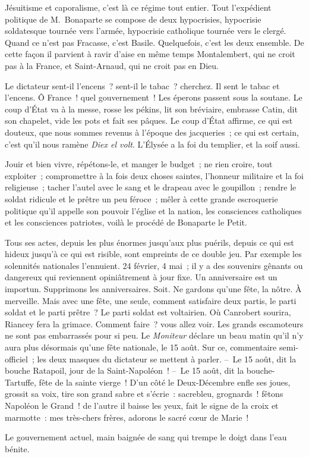 \documentclass[french,twoside]{book} %
\begin{document}
Jésuitisme et caporalisme, c’est là ce régime tout entier. Tout l’expédient politique de M. Bonaparte se compose de deux hypocrisies, hypocrisie soldatesque tournée vers l’armée, hypocrisie catholique tournée vers le clergé. Quand ce n’est pas Fracasse, c’est Basile. Quelquefois, c’est les deux ensemble. De cette façon il parvient à ravir d’aise en même temps Montalembert, qui ne croit pas à la France, et Saint-Arnaud, qui ne croit pas en Dieu.\par
Le dictateur sent-il l’encens ? sent-il le tabac ? cherchez. Il sent le tabac et l’encens. Ô France ! quel gouvernement ! Les éperons passent sous la soutane. Le coup d’État va à la messe, rosse les pékins, lit son bréviaire, embrasse Catin, dit son chapelet, vide les pots et fait ses pâques. Le coup d’État affirme, ce qui est douteux, que nous sommes revenus à l’époque des jacqueries ; ce qui est certain, c’est qu’il nous ramène \emph{Diex el volt}. L’Élysée a la foi du templier, et la soif aussi.\par
Jouir et bien vivre, répétons-le, et manger le budget ; ne rien croire, tout exploiter ; compromettre à la fois deux choses saintes, l’honneur militaire et la foi religieuse ; tacher l’autel avec le sang et le drapeau avec le goupillon ; rendre le soldat ridicule et le prêtre un peu féroce ; mêler à cette grande escroquerie politique qu’il appelle son pouvoir l’église et la nation, les consciences catholiques et les consciences patriotes, voilà le procédé de Bonaparte le Petit.\par
Tous ses actes, depuis les plus énormes jusqu’aux plus puérils, depuis ce qui est hideux jusqu’à ce qui est risible, sont empreints de ce double jeu. Par exemple les solennités nationales l’ennuient. 24 février, 4 mai ; il y a des souvenirs gênants ou dangereux qui reviennent opiniâtrement à jour fixe. Un anniversaire est un importun. Supprimons les anniversaires. Soit. Ne gardons qu’une fête, la nôtre. À merveille. Mais avec une fête, une seule, comment satisfaire deux partis, le parti soldat et le parti prêtre ? Le parti soldat est voltairien. Où Canrobert sourira, Riancey fera la grimace. Comment faire ? vous allez voir. Les grands escamoteurs ne sont pas embarrassés pour si peu. Le \emph{Moniteur} déclare un beau matin qu’il n’y aura plus désormais qu’une fête nationale, le 15 août. Sur ce, commentaire semi-officiel ; les deux masques du dictateur se mettent à parler. – Le 15 août, dit la bouche Ratapoil, jour de la Saint-Napoléon ! – Le 15 août, dit la bouche-Tartuffe, fête de la sainte vierge ! D’un côté le Deux-Décembre enfle ses joues, grossit sa voix, tire son grand sabre et s’écrie : sacrebleu, grognards ! fêtons Napoléon le Grand ! de l’autre il baisse les yeux, fait le signe de la croix et marmotte : mes très-chers frères, adorons le sacré cœur de Marie !\par
Le gouvernement actuel, main baignée de sang qui trempe le doigt dans l’eau bénite.
\end{document}
